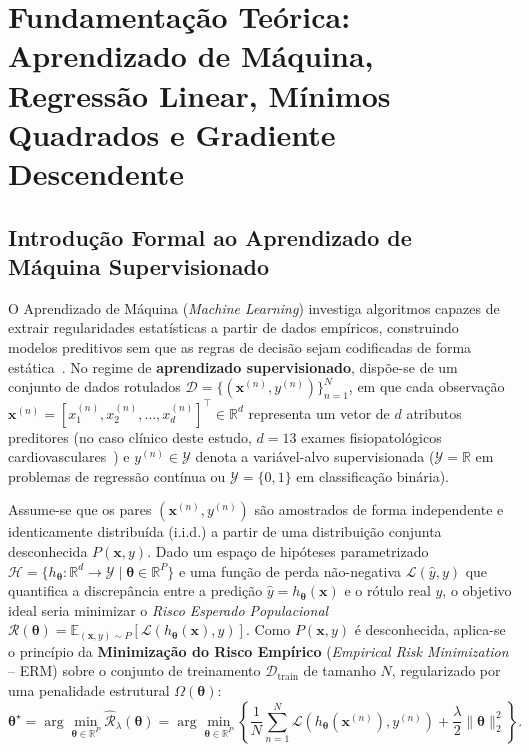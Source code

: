 ﻿\documentclass[runningheads]{llncs}
\begin{document}
\section{Fundamenta\c{c}\~{a}o Te\'{o}rica: Aprendizado de M\'{a}quina, Regress\~{a}o Linear, M\'{i}nimos Quadrados e Gradiente Descendente}
\label{sec:fundamentacao}

\subsection{Introdu\c{c}\~{a}o Formal ao Aprendizado de M\'{a}quina Supervisionado}
O Aprendizado de M\'{a}quina (\textit{Machine Learning}) investiga algoritmos capazes de extrair regularidades estat\'{i}sticas a partir de dados emp\'{i}ricos, construindo modelos preditivos sem que as regras de decis\~{a}o sejam codificadas de forma est\'{a}tica~\cite{goodfellow2016deep}. No regime de \textbf{aprendizado supervisionado}, disp\~{o}e-se de um conjunto de dados rotulados $\mathcal{D} = \{(\mathbf{x}^{(n)}, y^{(n)})\}_{n=1}^{N}$, em que cada observa\c{c}\~{a}o $\mathbf{x}^{(n)} = [x_1^{(n)}, x_2^{(n)}, \dots, x_d^{(n)}]^\top \in \mathbb{R}^d$ representa um vetor de $d$ atributos preditores (no caso cl\'{i}nico deste estudo, $d = 13$ exames fisiopatol\'{o}gicos cardiovasculares~\cite{detrano1989international}) e $y^{(n)} \in \mathcal{Y}$ denota a vari\'{a}vel-alvo supervisionada ($\mathcal{Y} = \mathbb{R}$ em problemas de regress\~{a}o cont\'{i}nua ou $\mathcal{Y} = \{0, 1\}$ em classifica\c{c}\~{a}o bin\'{a}ria).

Assume-se que os pares $(\mathbf{x}^{(n)}, y^{(n)})$ s\~{a}o amostrados de forma independente e identicamente distribu\'{i}da (i.i.d.) a partir de uma distribui\c{c}\~{a}o conjunta desconhecida $P(\mathbf{x}, y)$. Dado um espa\c{c}o de hip\'{o}teses parametrizado $\mathcal{H} = \{h_{\boldsymbol{\theta}} : \mathbb{R}^d \to \mathcal{Y} \mid \boldsymbol{\theta} \in \mathbb{R}^P\}$ e uma fun\c{c}\~{a}o de perda n\~{a}o-negativa $\mathcal{L}(\hat{y}, y)$ que quantifica a discrep\^{a}ncia entre a predi\c{c}\~{a}o $\hat{y} = h_{\boldsymbol{\theta}}(\mathbf{x})$ e o r\'{o}tulo real $y$, o objetivo ideal seria minimizar o \textit{Risco Esperado Populacional} $\mathcal{R}(\boldsymbol{\theta}) = \mathbb{E}_{(\mathbf{x}, y) \sim P}[\mathcal{L}(h_{\boldsymbol{\theta}}(\mathbf{x}), y)]$. Como $P(\mathbf{x}, y)$ \'{e} desconhecida, aplica-se o princ\'{i}pio da \textbf{Minimiza\c{c}\~{a}o do Risco Emp\'{i}rico} (\textit{Empirical Risk Minimization} -- ERM) sobre o conjunto de treinamento $\mathcal{D}_{\text{train}}$ de tamanho $N$, regularizado por uma penalidade estrutural $\Omega(\boldsymbol{\theta})$:
\begin{equation}
    \boldsymbol{\theta}^\star = \arg\min_{\boldsymbol{\theta} \in \mathbb{R}^P} \hat{\mathcal{R}}_{\lambda}(\boldsymbol{\theta}) = \arg\min_{\boldsymbol{\theta} \in \mathbb{R}^P} \left\{ \frac{1}{N} \sum_{n=1}^{N} \mathcal{L}\!\left(h_{\boldsymbol{\theta}}(\mathbf{x}^{(n)}), y^{(n)}\right) + \frac{\lambda}{2}\|\boldsymbol{\theta}\|_2^2 \right\}.
    \label{eq:erm}
\end{equation}
\end{document}
